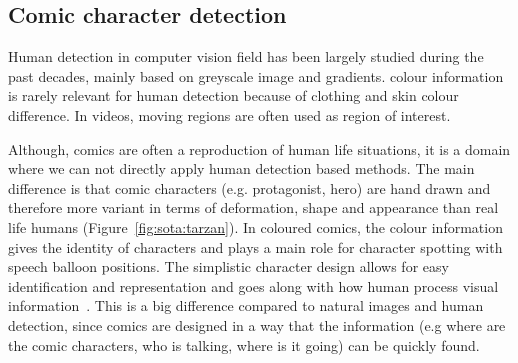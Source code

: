\subsection{Comic character detection}
\label{sec:sota:comic_character}



Human detection in computer vision field has been largely studied during the past decades, mainly based on greyscale image and gradients. colour information is rarely relevant for human detection because of clothing and skin colour difference. In videos, moving regions are often used as region of interest.

Although, comics are often a reproduction of human life situations, it is a domain where we can not directly apply human detection based methods.
The main difference is that comic characters (e.g. protagonist, hero) are hand drawn and therefore more variant in terms of deformation, shape and appearance than real life humans (Figure~\ref{fig:sota:tarzan}).
In coloured comics, the colour information gives the identity of characters and plays a main role for character spotting with speech balloon positions. 
The simplistic character design allows for easy identification and representation and goes along with how human process visual information~\cite{ahmadimpactsOfManga,medley2010discerningPictures,cohn2010limits}.
This is a big difference compared to natural images and human detection, since comics are designed in a way that the information (e.g where are the comic characters, who is talking, where is it going) can be quickly found.%

